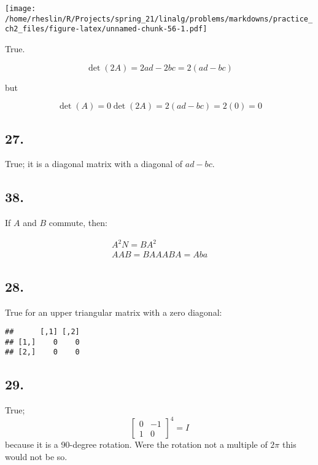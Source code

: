 \documentclass[]{article}
\newenvironment{Shaded}{\begin{snugshade}}{\end{snugshade}}
\newcommand{\DecValTok}[1]{\textcolor[rgb]{0.69,0.50,0.00}{#1}}
\newcommand{\KeywordTok}[1]{\textcolor[rgb]{0.12,0.11,0.11}{\textbf{#1}}}
\newcommand{\NormalTok}[1]{\textcolor[rgb]{0.12,0.11,0.11}{#1}}
\newcommand{\OperatorTok}[1]{\textcolor[rgb]{0.12,0.11,0.11}{#1}}
\newcommand{\StringTok}[1]{\textcolor[rgb]{0.75,0.01,0.01}{#1}}
\newcommand{\m}[1]{\begin{bmatrix}#1\end{bmatrix}}
\newcommand{\meq}[1]{\begin{split}#1\end{split}}
\begin{document}
\texttt{[image: /home/rheslin/R/Projects/spring\_21/linalg/problems/markdowns/practice\_ch2\_files/figure-latex/unnamed-chunk-56-1.pdf]}

True.

\[\det(2A) = 2ad-2bc=2(ad-bc)\]

but

\[\det(A)=0
\det(2A)=2(ad-bc)=2(0)=0\]

\hypertarget{section-138}{%
\subsection{27.}\label{section-138}}

True; it is a diagonal matrix with a diagonal of \(ad-bc\).

\hypertarget{section-139}{%
\subsection{38.}\label{section-139}}

If \(A\) and \(B\) commute, then:

\[\meq{A^2N=BA^2\\
AAB=BAA
ABA=Aba
}\]

\hypertarget{section-140}{%
\subsection{28.}\label{section-140}}

True for an upper triangular matrix with a zero diagonal:

\begin{Shaded}
\end{Shaded}

\begin{verbatim}
##      [,1] [,2]
## [1,]    0    0
## [2,]    0    0
\end{verbatim}

\hypertarget{section-141}{%
\subsection{29.}\label{section-141}}

True; \[\m{0&-1\\1&0}^4=I\] because it is a 90-degree rotation. Were the
rotation not a multiple of \(2\pi\) this would not be so.
\end{document}
